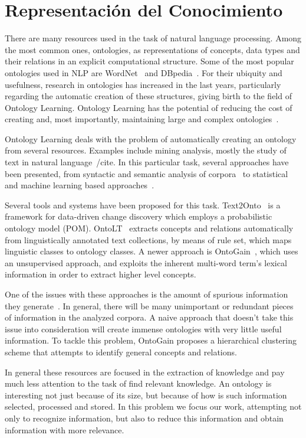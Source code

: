   \section{Representación del Conocimiento}

  There are many resources used in the task of
natural language processing. Among the most common ones, ontologies, as representations
of concepts, data types and their relations in an explicit computational structure.
Some of the most popular ontologies used in NLP are WordNet~\cite{} and DBpedia~\cite{}.
For their ubiquity and usefulness, research in ontologies has increased in the last years,
particularly regarding the automatic creation of these structures,
giving birth to the field of Ontology Learning.
Ontology Learning has the potential of reducing the cost of creating
and, most importantly, maintaining large and complex ontologies~\cite{cimiano2009ontology}.

Ontology Learning deals with the problem of automatically creating an
ontology from several resources. Examples include mining analysis, mostly
the study of text in natural language~/cite{}. In this
particular task, several approaches have been presented, from syntactic and
semantic analysis of corpora~\cite{} to statistical and machine learning based
approaches~\cite{}. 

Several tools and systems have been proposed for this task. 
Text2Onto~\cite{cimiano2005text2onto} is a framework for
data-driven change discovery which employs a probabilistic 
ontology model (POM).
OntoLT~\cite{buitelaar2004ontolt} extracts concepts and
relations automatically from linguistically annotated text collections,
by means of rule set, which maps linguistic classes to ontology classes.
A newer approach is OntoGain~\cite{drymonas2010unsupervised}, 
which uses an unsupervised approach,
and exploits the inherent multi-word term's lexical information
in order to extract higher level concepts.

One of the issues with these approaches is the amount of spurious
information they generate~\cite{Maimon:2015:OLT:2870689.2870690}.
In general, there will be many unimportant
or redundant pieces of information in the analyzed corpora. A naive
approach that doesn't take this issue into consideration will create
immense ontologies with very little useful information. To tackle
this problem, OntoGain proposes a hierarchical clustering scheme
that attempts to identify general concepts and relations.

In general these resources are focused in the extraction of knowledge and
pay much less attention to the task of find relevant knowledge. 
An ontology is interesting not just because of its size, but 
because of how is such information selected, processed and stored.
In this problem we focus our work, attempting not only 
to recognize information, but also to reduce this information and obtain
information with more relevance.

